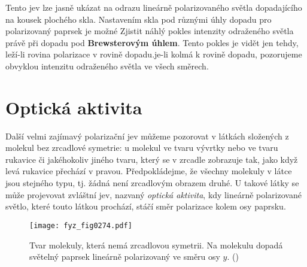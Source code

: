     Tento jev lze jasně ukázat na odrazu lineárně polarizovaného světla dopadajícího na kousek
    plochého skla. Nastavením skla pod různými úhly dopadu pro polarizovaný paprsek je možné Zjistit
    náhlý pokles intenzity odraženého světla právě při dopadu pod \textbf{Brewsterovým úhlem}. Tento
    pokles je vidět jen tehdy, leží-li rovina polarizace v rovině dopadu.je-li kolmá k rovině
    dopadu, pozorujeme obvyklou intenzitu odraženého světla ve všech směrech.

  \section{Optická aktivita}\label{fyz:IchapXXXIIIsecV}
    Další velmi zajímavý polarizační jev můžeme pozorovat v látkách složených z molekul bez
    zrcadlové symetrie: u molekul ve tvaru vývrtky nebo ve tvaru rukavice či jakéhokoliv jiného
    tvaru, který se v zrcadle zobrazuje tak, jako když levá rukavice přechází v pravou.
    Předpokládejme, že všechny molekuly v látce jsou stejného typu, tj. žádná není zrcadlovým
    obrazem druhé. U takové látky se může projevovat zvláštní jev, nazvaný \emph{optická aktivita},
    kdy lineárně polarizované světlo, které touto látkou prochází, stáčí směr polarizace kolem osy
    paprsku.
  
    \begin{figure}[ht!] %
      \centering
      \texttt{[image: fyz\_fig0274.pdf]}
      \caption{Tvar molekuly, která nemá zrcadlovou symetrii. Na molekulu dopadá světelný paprsek
              lineárně polarizovaný ve směru osy \(y\). (\cite[s.~427]{Feynman01})}
      \label{fyz:fig0274}
    \end{figure}

